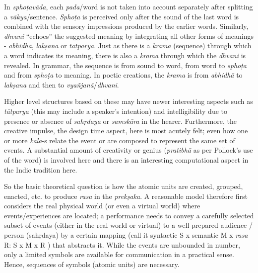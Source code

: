 In \textsl{sphoṭavāda}, each \textsl{pada}/word is not taken into account separately after splitting a \textsl{vākya}/sentence. \textsl{Sphoṭa} is perceived only after the sound of the last word is combined with the sensory impressions produced by the earlier words. Similarly, \textsl{dhvani} “echoes” the suggested meaning by integrating all other forms of meanings - \textsl{abhidhā}, \textsl{lakṣana} or \textsl{tātparya}. Just as there is a \textsl{krama} (sequence) through which a word indicates its meaning, there is also a \textsl{krama} through which the \textsl{dhvani} is revealed. In grammar, the sequence is from sound to word, from word to \textsl{sphoṭa} and from \textsl{sphoṭa} to meaning. In poetic creations, the \textsl{krama} is from \textsl{abhidhā} to \textsl{lakṣana} and then to \textsl{vyañjanā}/\textsl{dhvani}.

Higher level structures based on these may have newer interesting aspects such as \textsl{tātparya} (this may include a speaker’s intention) and intelligibility due to presence or absence of \textsl{sahṛdaya} or \textsl{samskāra} in the hearer. Furthermore, the creative impulse, the design time aspect, here is most acutely felt; even how one or more \textsl{kalā}-s relate the event or are composed to represent the same set of events. A substantial amount of creativity or genius (\textsl{pratibhā} as per Pollock’s use of the word) is involved here and there is an interesting computational aspect in the Indic tradition here.

So the basic theoretical question is how the atomic units are created, grouped, enacted, etc. to produce \textsl{rasa} in the \textsl{prekṣaka}. A reasonable model therefore first considers the real physical world (or even a virtual world) where events/experiences are located; a performance needs to convey a carefully selected subset of events (either in the real world or virtual) to a well-prepared audience / person (sahṛdaya) by a certain mapping (call it syntactic S x semantic M x \textsl{rasa} R: S x M x R ) that abstracts it. While the events are unbounded in number, only a limited symbols are available for communication in a practical sense. Hence, sequences of symbols (atomic units) are necessary. 

